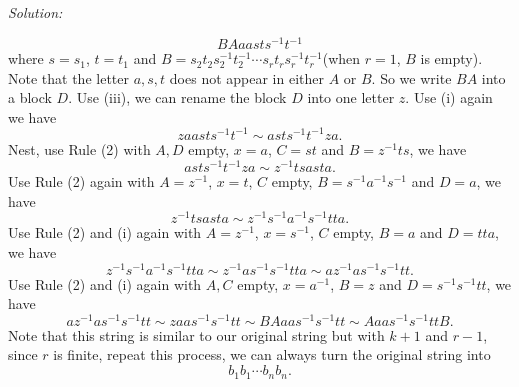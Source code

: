 \documentclass[a4paper, 12pt]{article}
\newenvironment{solution}
    {\textit{Solution:}}
    {}
\begin{document}
\begin{solution}
\begin{enumerate}[(a)]
\[BAaasts^{-1}t^{-1}\]
where \(s=s_1\), \(t=t_1\) and \(B=s_2t_2s_2^{-1}t_2^{-1}\cdots s_rt_rs_r^{-1}t_r^{-1}\)(when \(r=1\), \(B\) is empty). Note that the letter \(a,s,t\) does not appear in either \(A\) or \(B\). So we write \(BA\) into a block \(D\). 
Use (iii), we can rename the block \(D\) into one letter \(z\). Use (i) again we have 
\[zaasts^{-1}t^{-1}\sim asts^{-1}t^{-1}za.\]
Nest, use Rule (2) with \(A,D\) empty, \(x=a\), \(C=st\) and \(B=z^{-1}ts\), we have 
\[asts^{-1}t^{-1}za\sim z^{-1}tsasta.\]
Use Rule (2) again with \(A=z^{-1}\), \(x=t\), \(C\) empty, \(B=s^{-1}a^{-1}s^{-1}\) and \(D=a\), we have 
\[z^{-1}tsasta\sim z^{-1}s^{-1}a^{-1}s^{-1}tta.\]
Use Rule (2) and (i) again with \(A=z^{-1}\), \(x=s^{-1}\), \(C\) empty, \(B=a\) and \(D=tta\), we have 
\[z^{-1}s^{-1}a^{-1}s^{-1}tta\sim z^{-1}as^{-1}s^{-1}tta\sim az^{-1}as^{-1}s^{-1}tt.\]
Use Rule (2) and (i) again with \(A,C\) empty, \(x=a^{-1}\), \(B=z\) and \(D=s^{-1}s^{-1}tt\), we have 
\[az^{-1}as^{-1}s^{-1}tt\sim zaas^{-1}s^{-1}tt\sim BAaas^{-1}s^{-1}tt\sim Aaas^{-1}s^{-1}ttB.\]
Note that this string is similar to our original string but with \(k+1\) and \(r-1\), since \(r\) is finite, repeat this process, we can always turn the original string into 
\[b_1b_1\cdots b_nb_n.\]
\end{enumerate}
\end{solution}
\end{document}
